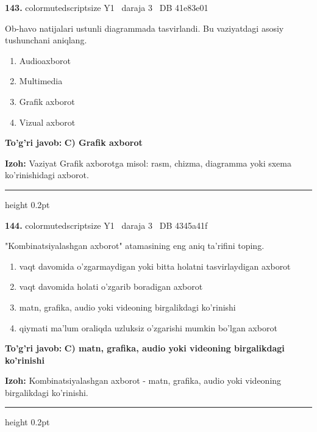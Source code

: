 \documentclass[10pt,a4paper,oneside]{article}
\begin{document}
\noindent\textbf{\color{ink}143.}  {color{muted}scriptsize Y1 \textbullet\ daraja 3 \textbullet\ DB 41e83e01}
\par
Ob-havo natijalari ustunli diagrammada tasvirlandi. Bu vaziyatdagi asosiy tushunchani aniqlang.
\begin{enumerate}[label=\Alph*),leftmargin=9mm]
\item Audioaxborot
\item Multimedia
\item Grafik axborot
\item Vizual axborot
\end{enumerate}
\begin{tcolorbox}[enhanced,breakable,colback=teal!4,colframe=teal!50!black,boxrule=0.5pt,arc=1.1mm,left=3mm,right=3mm,top=1.7mm,bottom=1.7mm,before skip=2mm,after skip=2mm]
\textbf{\color{teal}To'g'ri javob:} \textbf{C) Grafik axborot}
\par\smallskip
\textbf{Izoh:} Vaziyat Grafik axborotga misol: rasm, chizma, diagramma yoki sxema ko'rinishidagi axborot.
\end{tcolorbox}
\vspace{2mm}\hrule height 0.2pt \vspace{3mm}

\noindent\textbf{\color{ink}144.}  {color{muted}scriptsize Y1 \textbullet\ daraja 3 \textbullet\ DB 4345a41f}
\par
"Kombinatsiyalashgan axborot" atamasining eng aniq ta'rifini toping.
\begin{enumerate}[label=\Alph*),leftmargin=9mm]
\item vaqt davomida o'zgarmaydigan yoki bitta holatni tasvirlaydigan axborot
\item vaqt davomida holati o'zgarib boradigan axborot
\item matn, grafika, audio yoki videoning birgalikdagi ko'rinishi
\item qiymati ma'lum oraliqda uzluksiz o'zgarishi mumkin bo'lgan axborot
\end{enumerate}
\begin{tcolorbox}[enhanced,breakable,colback=teal!4,colframe=teal!50!black,boxrule=0.5pt,arc=1.1mm,left=3mm,right=3mm,top=1.7mm,bottom=1.7mm,before skip=2mm,after skip=2mm]
\textbf{\color{teal}To'g'ri javob:} \textbf{C) matn, grafika, audio yoki videoning birgalikdagi ko'rinishi}
\par\smallskip
\textbf{Izoh:} Kombinatsiyalashgan axborot - matn, grafika, audio yoki videoning birgalikdagi ko'rinishi.
\end{tcolorbox}
\vspace{2mm}\hrule height 0.2pt \vspace{3mm}
\end{document}
